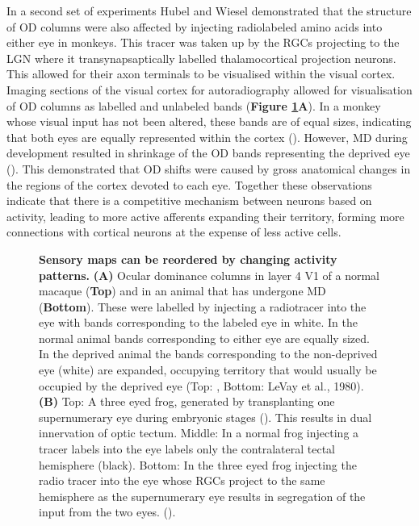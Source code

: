 In a second set of experiments Hubel and Wiesel demonstrated that the structure of OD columns were also affected by injecting radiolabeled amino acids into either  eye  in monkeys. This tracer was taken up by the RGCs projecting to the LGN where it transynapsaptically labelled thalamocortical projection neurons. This allowed for their axon terminals to be visualised within the visual cortex. Imaging sections of the visual cortex for autoradiography allowed for visualisation of OD columns as labelled and unlabeled bands (\textbf{Figure \ref{fig:I_sensory_maps}A}). In a monkey whose visual input has not been altered, these bands are of equal sizes, indicating that both eyes are equally represented within the cortex (\cite{Wiesel1974AutoradiographicTransport}). However, MD during development resulted in shrinkage of the OD bands representing the deprived eye (\cite{Hubel1977PlasticityCortex.}). This demonstrated that OD shifts were caused by gross anatomical changes in the regions of the cortex devoted to each eye. Together these observations indicate that there is a competitive mechanism between neurons based on activity, leading to more active afferents expanding their territory, forming more connections with cortical neurons at the expense of less active cells.

\begin{figure}[!ht]
            \caption[\textbf{\label{fig:I_sensory_maps}\textbf{Sensory maps can be reordered by changing activity patterns.}}]{ \textbf{\label{fig:I_sensory_maps} Sensory maps can be reordered by changing activity patterns.}  \textbf{(A)} Ocular dominance columns in layer 4 V1 of a normal macaque (\textbf{Top}) and in an animal that has undergone MD (\textbf{Bottom}). These were labelled by injecting a radiotracer into the eye with bands corresponding to the labeled eye in white. In the normal animal bands corresponding to either eye are equally sized. In the deprived animal the bands corresponding to the non-deprived eye (white) are expanded, occupying territory that would usually be occupied by the deprived eye (Top: \cite{Hubel1977PlasticityCortex.}, Bottom: LeVay et al., 1980). \textbf{(B)} Top: A three eyed frog, generated by transplanting one supernumerary eye during embryonic stages (\cite{Constantine-Paton1978Eye-specificFrogs}). This results in dual innervation of optic tectum. Middle: In a normal frog injecting a tracer labels into the eye labels only the contralateral tectal hemisphere (black). Bottom: In the three eyed frog injecting the radio tracer into the eye whose RGCs project to the same hemisphere as the supernumerary eye results in segregation of the input from the two eyes.  (\cite{Maya-Vetencourt2013Experience-DependentSystem}).
}
      \end{figure}

